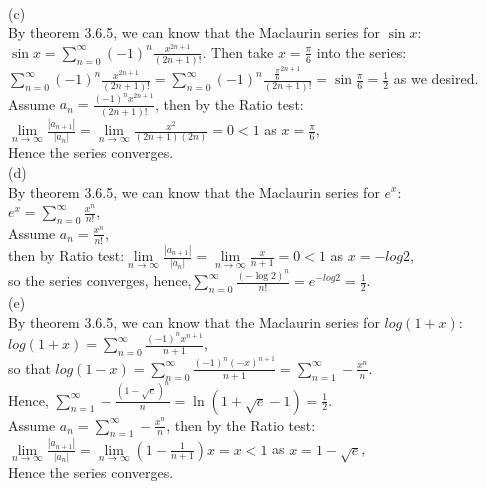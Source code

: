\documentclass[12pt,reqno]{amsart}
\begin{document}
\\(c) 
\\By theorem 3.6.5, we can know that the Maclaurin series for $\sin x$:
\\$\sin x=\sum_{n=0}^{\infty}(-1)^n \frac{x^{2 n+1}}{(2 n+1) !}$.
Then take $x=\frac{\pi}{6}$ into the series:
\\$\sum_{n=0}^{\infty}(-1)^n \frac{x^{2 n+1}}{(2 n+1) !}=\sum_{n=0}^{\infty}(-1)^n \frac{\frac{\pi}{6}^{2 n+1}}{(2 n+1) !}=\sin\frac{\pi}{6}=\frac{1}{2}$ as we desired.
\\Assume $ a_n=\frac{(-1)^nx^{2n+1}}{(2 n+1) !} $, then by the Ratio test:
\\$ \lim\limits _{n \rightarrow \infty}\frac{|a_{n+1}|}{|a_n|}=\lim\limits _{n \rightarrow \infty} \frac{x^2}{(2 n+1)(2 n)}=0<1 $ as $x=\frac{\pi}{6}$,
\\Hence the series converges.
\\(d)
\\By theorem 3.6.5, we can know that the Maclaurin series for $ e^x$:\\$e^x=\sum\limits_{n=0}^{\infty}\frac{x^n}{n!}$,
\\Assume $ a_n=\frac{x^n}{n !} $, 
\\then by Ratio test:$ \lim\limits _{n \rightarrow \infty}\frac{|a_{n+1}|}{|a_n|}=\lim\limits _{n \rightarrow \infty} \frac{x}{n+1}=0 <1 $ as $x=-log2$,\\ so the series converges, hence,$\sum\limits_{n=0}^{\infty} \frac{(-\log 2)^{n}}{n !}=e^ {-log 2}=\frac{1}{2}$.
\\(e)
\\By theorem 3.6.5, we can know that the Maclaurin series for $ log(1+x)$:\\
$log(1+x)=\sum\limits_{n=0}^{\infty}\frac{(-1)^{n} x^{n+1} }{n+1}$,
\\ so that $log(1-x)=\sum\limits_{n=0}^{\infty}\frac{(-1)^{n} (-x)^{n+1} }{n+1}=\sum\limits_{n=1}^{\infty}-\frac{ x^{n} }{n}$.
\\Hence, $\sum\limits_{n=1}^{\infty} -\frac{(1-\sqrt{e})^n}{n}=\ln (1+\sqrt{e}-1)=\frac{1}{2}$.
\\Assume $ a_n=\sum\limits_{n=1}^{\infty}-\frac{ x^{n} }{n}$, then by the Ratio test:
\\$ \lim\limits _{n \rightarrow \infty}\frac{|a_{n+1}|}{|a_n|}=\lim\limits _{n \rightarrow \infty} (1-\frac{1}{n+1})x=x<1 $ as $x=1-\sqrt{e}$,
\\Hence the series converges.
\end{document}
